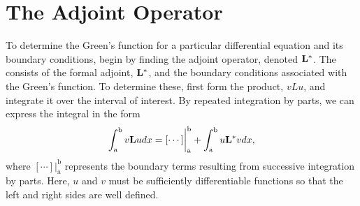 \section{The Adjoint Operator}
To determine the Green's function for a particular differential equation and its boundary conditions, begin by finding the adjoint operator, denoted \(\mathcal{\mathrm{\bf{L^*}}  }\). The  consists of the formal adjoint, \(\mathrm{\bf{L^*}}  \), and the boundary conditions associated with the Green's function. To determine these, first form the product, \(vLu\), and integrate it over the interval of interest. By repeated integration by parts, we can express the integral in the form
\begin{equation} \label{eq:adjoint}
	\int_\mathrm{a}^\mathrm{b} v \mathrm{\bf{L}} u dx = [\cdots]\biggr\rvert_\mathrm{a}^\mathrm{b} + \int_\mathrm{a}^\mathrm{b} u\mathrm{\bf{L^*}}  v dx,
\end{equation}
where \([\cdots]\biggr\rvert_\mathrm{a}^\mathrm{b}\) represents the boundary terms resulting from successive integration by parts. Here, \(u\) and \(v\) must be sufficiently differentiable functions so that the left and right sides are well defined. 

